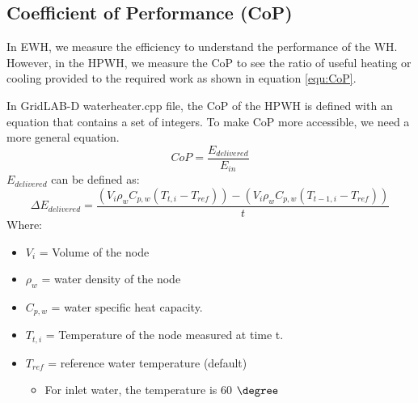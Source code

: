 \subsection{Coefficient of Performance (CoP)}
In EWH, we measure the efficiency to understand the performance of the WH. However, in the HPWH, we measure the CoP to see the ratio of useful heating or cooling provided to the required work as shown in equation \ref{equ:CoP}. \par
In GridLAB-D waterheater.cpp file, the CoP of the HPWH is defined with an equation that contains a set of integers. To make CoP more accessible, we need a more general equation. 
\begin{equation} \label{equ:CoP}
    CoP = \frac{E_{delivered}}{E_{in}}
\end{equation}
$E_{delivered}$ can be defined as:
\begin{equation}\label{equ:E_delivered}
    \Delta E_{delivered} = \frac{(V_{i}\rho_{w}C_{p,w}(T_{t,i}-T_{ref})) - (V_{i}\rho_{w}C_{p,w}(T_{t-1,i} - T_{ref}))}{t}
\end{equation}
Where:
\begin{itemize}
    \item $V_{i}$ = Volume of the node
    \item $\rho_{w}$ = water density of the node
    \item $C_{p,w}$ = water specific heat capacity.
    \item $T_{t,i}$ = Temperature of the node measured at time t.
    \item $T_{ref}$ = reference water temperature (default)
    \begin{itemize}
        \item For inlet water, the temperature is 60 $\degree$
    \end{itemize}
\end{itemize}
\newpage

